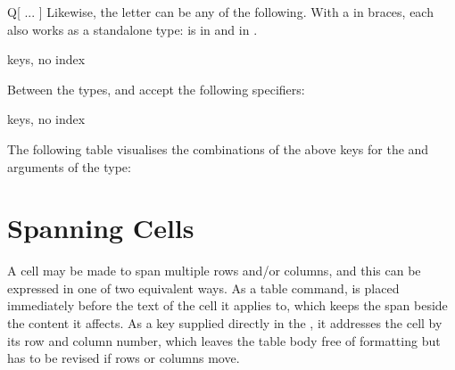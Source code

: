 \begin{codedescribe}[code, new = 2021B]{Q[ ... ]}
  Likewise, the  letter can be any of the following. With a  in braces, each also works as a standalone type:  is  in  and  in .
  \begin{describelist}{keys, no index}
  \end{describelist}

  Between the types,  and  accept the following specifiers:
  \begin{describelist}{keys, no index}
  \end{describelist}
\end{codedescribe}

The following table visualises the combinations of the above keys for the  and  arguments of the  type:
\begin{center}
\end{center}

\section{Spanning Cells}\label{impatient:spanning}
A cell may be made to span multiple rows and/or columns, and this can be expressed in one of two equivalent ways. As a table command,  is placed immediately before the text of the cell it applies to, which keeps the span beside the content it affects. As a  key supplied directly in the , it addresses the cell by its row and column number, which leaves the table body free of formatting but has to be revised if rows or columns move.

